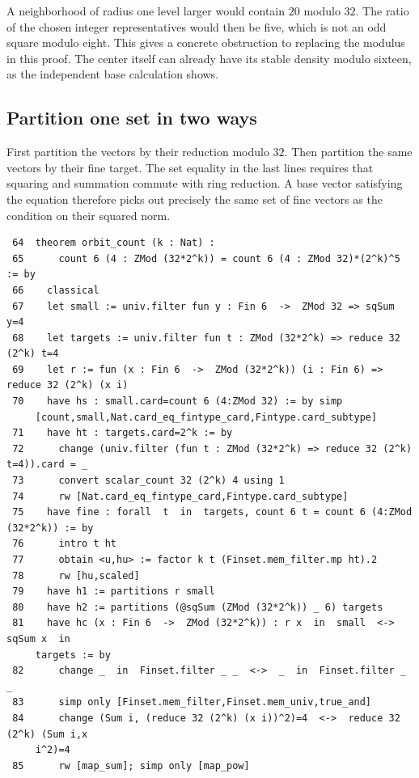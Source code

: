 \documentclass[12pt,letterpaper]{article}
\begin{document}
A neighborhood of radius one level larger would contain $20$ modulo $32$. The ratio of the chosen integer representatives would then be five, which is not an odd square modulo eight. This gives a concrete obstruction to replacing the modulus in this proof. The center itself can already have its stable density modulo sixteen, as the independent base calculation shows.
\clearpage{}\subsection*{Partition one set in two ways}\label{extract-FourLift64}
First partition the vectors by their reduction modulo $32$. Then partition the same vectors by their fine target. The set equality in the last lines requires that squaring and summation commute with ring reduction. A base vector satisfying the equation therefore picks out precisely the same set of fine vectors as the condition on their squared norm.
\par
{\fontsize{9.2}{11.2}\selectfont\begin{verbatim}
 64  theorem orbit_count (k : Nat) :
 65      count 6 (4 : ZMod (32*2^k)) = count 6 (4 : ZMod 32)*(2^k)^5 := by
 66    classical
 67    let small := univ.filter fun y : Fin 6  ->  ZMod 32 => sqSum y=4
 68    let targets := univ.filter fun t : ZMod (32*2^k) => reduce 32 (2^k) t=4
 69    let r := fun (x : Fin 6  ->  ZMod (32*2^k)) (i : Fin 6) => reduce 32 (2^k) (x i)
 70    have hs : small.card=count 6 (4:ZMod 32) := by simp
     [count,small,Nat.card_eq_fintype_card,Fintype.card_subtype]
 71    have ht : targets.card=2^k := by
 72      change (univ.filter (fun t : ZMod (32*2^k) => reduce 32 (2^k) t=4)).card = _
 73      convert scalar_count 32 (2^k) 4 using 1
 74      rw [Nat.card_eq_fintype_card,Fintype.card_subtype]
 75    have fine : forall  t  in  targets, count 6 t = count 6 (4:ZMod (32*2^k)) := by
 76      intro t ht
 77      obtain <u,hu> := factor k t (Finset.mem_filter.mp ht).2
 78      rw [hu,scaled]
 79    have h1 := partitions r small
 80    have h2 := partitions (@sqSum (ZMod (32*2^k)) _ 6) targets
 81    have hc (x : Fin 6  ->  ZMod (32*2^k)) : r x  in  small  <->  sqSum x  in
     targets := by
 82      change _  in  Finset.filter _ _  <->  _  in  Finset.filter _ _
 83      simp only [Finset.mem_filter,Finset.mem_univ,true_and]
 84      change (Sum i, (reduce 32 (2^k) (x i))^2)=4  <->  reduce 32 (2^k) (Sum i,x
     i^2)=4
 85      rw [map_sum]; simp only [map_pow]
\end{verbatim}}
\end{document}
